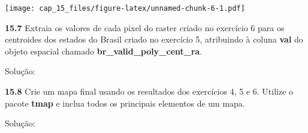 \documentclass[
]{book}
\newenvironment{Shaded}{\begin{snugshade}}{\end{snugshade}}
\newcommand{\AttributeTok}[1]{\textcolor[rgb]{0.77,0.63,0.00}{#1}}
\newcommand{\CommentTok}[1]{\textcolor[rgb]{0.56,0.35,0.01}{\textit{#1}}}
\newcommand{\FunctionTok}[1]{\textcolor[rgb]{0.00,0.00,0.00}{#1}}
\newcommand{\NormalTok}[1]{#1}
\newcommand{\OtherTok}[1]{\textcolor[rgb]{0.56,0.35,0.01}{#1}}
\newcommand{\SpecialCharTok}[1]{\textcolor[rgb]{0.00,0.00,0.00}{#1}}
\begin{document}
\texttt{[image: cap\_15\_files/figure-latex/unnamed-chunk-6-1.pdf]}

\textbf{15.7}
Extraia os valores de cada pixel do raster criado no exercício 6 para os centroides dos estados do Brasil criado no exercício 5, atribuindo à coluna \textbf{val} do objeto espacial chamado \textbf{br\_valid\_poly\_cent\_ra}.

Solução:

\begin{Shaded}
\end{Shaded}

\textbf{15.8}
Crie um mapa final usando os resultados dos exercícios 4, 5 e 6. Utilize o pacote \textbf{tmap} e inclua todos os principais elementos de um mapa.

Solução:
\end{document}
